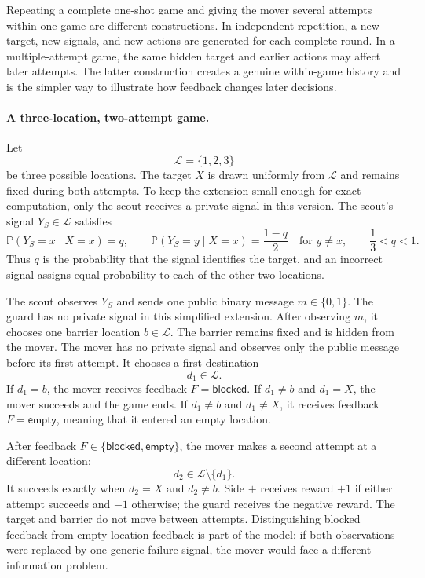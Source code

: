Repeating a complete one-shot game and giving the mover several attempts within one game are different constructions. In independent repetition, a new target, new signals, and new actions are generated for each complete round. In a multiple-attempt game, the same hidden target and earlier actions may affect later attempts. The latter construction creates a genuine within-game history and is the simpler way to illustrate how feedback changes later decisions.

\paragraph{A three-location, two-attempt game.}
Let
\[
    \mathcal{L}=\{1,2,3\}
\]
be three possible locations. The target $X$ is drawn uniformly from $\mathcal{L}$ and remains fixed during both attempts. To keep the extension small enough for exact computation, only the scout receives a private signal in this version. The scout's signal $Y_S\in\mathcal{L}$ satisfies
\[
    \mathbb{P}(Y_S=x\mid X=x)=q,
    \qquad
    \mathbb{P}(Y_S=y\mid X=x)=\frac{1-q}{2}
    \quad\text{for }y\neq x,
    \qquad
    \frac13<q<1.
\]
Thus $q$ is the probability that the signal identifies the target, and an incorrect signal assigns equal probability to each of the other two locations.

The scout observes $Y_S$ and sends one public binary message $m\in\{0,1\}$. The guard has no private signal in this simplified extension. After observing $m$, it chooses one barrier location $b\in\mathcal{L}$. The barrier remains fixed and is hidden from the mover. The mover has no private signal and observes only the public message before its first attempt. It chooses a first destination
\[
    d_1\in\mathcal{L}.
\]
If $d_1=b$, the mover receives feedback $F=\mathsf{blocked}$. If $d_1\neq b$ and $d_1=X$, the mover succeeds and the game ends. If $d_1\neq b$ and $d_1\neq X$, it receives feedback $F=\mathsf{empty}$, meaning that it entered an empty location.

After feedback $F\in\{\mathsf{blocked},\mathsf{empty}\}$, the mover makes a second attempt at a different location:
\[
    d_2\in\mathcal{L}\setminus\{d_1\}.
\]
It succeeds exactly when $d_2=X$ and $d_2\neq b$. Side $+$ receives reward $+1$ if either attempt succeeds and $-1$ otherwise; the guard receives the negative reward. The target and barrier do not move between attempts. Distinguishing blocked feedback from empty-location feedback is part of the model: if both observations were replaced by one generic failure signal, the mover would face a different information problem.

